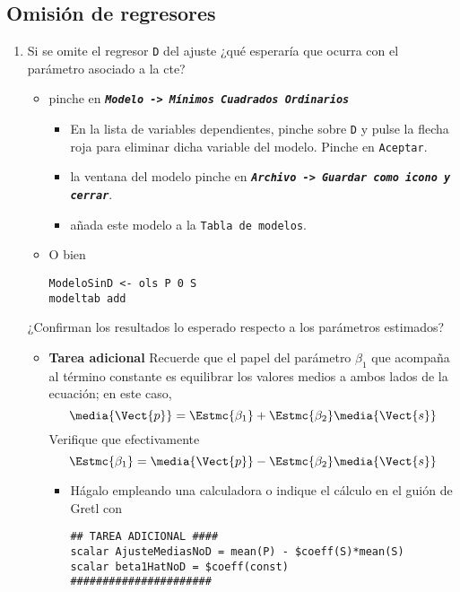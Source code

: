 \documentclass[11pt]{article}
\begin{document}
\subsection{Omisión de regresores}
\label{sec:orgb0c6c8b}
\begin{enumerate}
\item Si se omite el regresor \texttt{D} del ajuste ¿qué esperaría que ocurra
con el parámetro asociado a la cte?

\begin{itemize}
\item pinche en \textbf{\emph{\texttt{Modelo -> Mínimos Cuadrados Ordinarios}}}

\begin{itemize}
\item En la lista de variables dependientes, pinche sobre \texttt{D} y pulse la flecha roja para eliminar dicha variable del
modelo. Pinche en \texttt{Aceptar}.

\item la ventana del modelo pinche en \textbf{\emph{\texttt{Archivo -> Guardar como icono y cerrar}}}.

\item añada este modelo a la \texttt{Tabla de modelos}.
\end{itemize}

\item O bien 
\begin{verbatim}
ModeloSinD <- ols P 0 S
modeltab add
\end{verbatim}
\end{itemize}

¿Confirman los resultados lo esperado respecto a los parámetros estimados?

\begin{itemize}
\item \textbf{Tarea adicional} Recuerde que el papel del parámetro \(\beta_1\)
que acompaña al término constante es equilibrar los valores
medios a ambos lados de la ecuación; en este caso,
\[\media{\Vect{p}}=\Estmc{\beta_1}+\Estmc{\beta_2}\media{\Vect{s}}\]
Verifique que efectivamente
\[\Estmc{\beta_1}=\media{\Vect{p}}-\Estmc{\beta_2}\media{\Vect{s}}\]

\begin{itemize}
\item Hágalo empleando una calculadora o indique el cálculo en el guión de Gretl con
\begin{verbatim}
## TAREA ADICIONAL ####
scalar AjusteMediasNoD = mean(P) - $coeff(S)*mean(S)
scalar beta1HatNoD = $coeff(const)
######################	 
\end{verbatim}
\end{itemize}
\end{itemize}


\end{enumerate}
\end{document}
